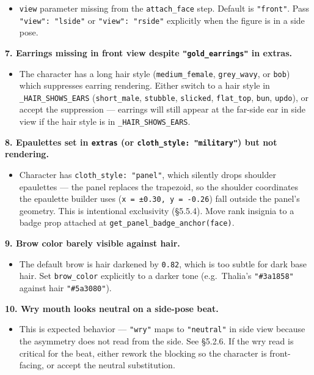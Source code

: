 \documentclass[
  12pt,
  letterpaper,
]{book}
\providecommand{\tightlist}{%
  \setlength{\itemsep}{0pt}\setlength{\parskip}{0pt}}
\begin{document}
\begin{itemize}
\tightlist
\item
  \texttt{view} parameter missing from the \texttt{attach\_face} step.
  Default is \texttt{"front"}. Pass \texttt{"view":\ "lside"} or
  \texttt{"view":\ "rside"} explicitly when the figure is in a side
  pose.
\end{itemize}

\textbf{7. Earrings missing in front view despite
\texttt{"gold\_earrings"} in extras.}

\begin{itemize}
\tightlist
\item
  The character has a long hair style (\texttt{medium\_female},
  \texttt{grey\_wavy}, or \texttt{bob}) which suppresses earring
  rendering. Either switch to a hair style in
  \texttt{\_HAIR\_SHOWS\_EARS} (\texttt{short\_male}, \texttt{stubble},
  \texttt{slicked}, \texttt{flat\_top}, \texttt{bun}, \texttt{updo}), or
  accept the suppression --- earrings will still appear at the far-side
  ear in side view if the hair style is in \texttt{\_HAIR\_SHOWS\_EARS}.
\end{itemize}

\textbf{8. Epaulettes set in \texttt{extras} (or
\texttt{cloth\_style:\ "military"}) but not rendering.}

\begin{itemize}
\tightlist
\item
  Character has \texttt{cloth\_style:\ "panel"}, which silently drops
  shoulder epaulettes --- the panel replaces the trapezoid, so the
  shoulder coordinates the epaulette builder uses
  (\texttt{x\ =\ ±0.30,\ y\ =\ -0.26}) fall outside the panel's
  geometry. This is intentional exclusivity (§5.5.4). Move rank insignia
  to a badge prop attached at \texttt{get\_panel\_badge\_anchor(face)}.
\end{itemize}

\textbf{9. Brow color barely visible against hair.}

\begin{itemize}
\tightlist
\item
  The default brow is hair darkened by \texttt{0.82}, which is too
  subtle for dark base hair. Set \texttt{brow\_color} explicitly to a
  darker tone (e.g.~Thalia's \texttt{"\#3a1858"} against hair
  \texttt{"\#5a3080"}).
\end{itemize}

\textbf{10. Wry mouth looks neutral on a side-pose beat.}

\begin{itemize}
\tightlist
\item
  This is expected behavior --- \texttt{"wry"} maps to
  \texttt{"neutral"} in side view because the asymmetry does not read
  from the side. See §5.2.6. If the wry read is critical for the beat,
  either rework the blocking so the character is front-facing, or accept
  the neutral substitution.
\end{itemize}
\end{document}
